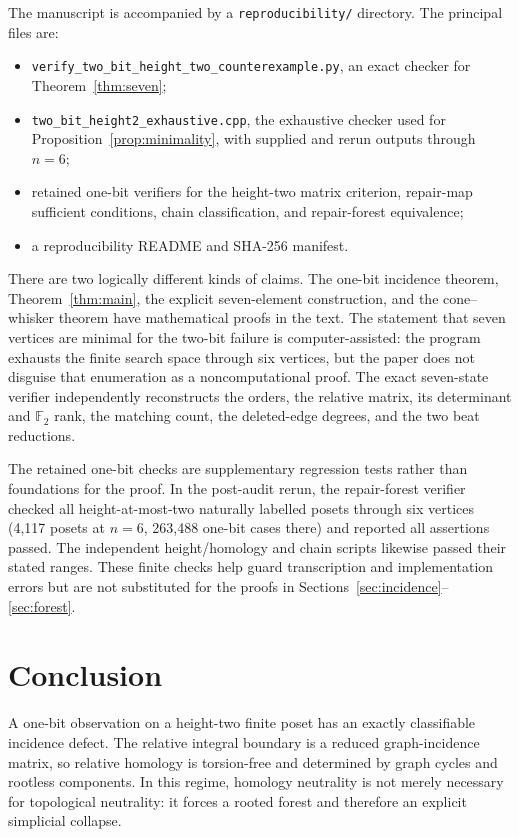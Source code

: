 \documentclass[11pt]{article}
\theoremstyle{definition}
\theoremstyle{remark}
\newcommand{\Ftwo}{\mathbb F_2}
\begin{document}
The manuscript is accompanied by a \texttt{reproducibility/} directory.  The principal
files are:
\begin{itemize}
\item \texttt{verify\_two\_bit\_height\_two\_counterexample.py}, an exact checker for
Theorem~\ref{thm:seven};
\item \texttt{two\_bit\_height2\_exhaustive.cpp}, the exhaustive checker used for
Proposition~\ref{prop:minimality}, with supplied and rerun outputs through $n=6$;
\item retained one-bit verifiers for the height-two matrix criterion, repair-map
sufficient conditions, chain classification, and repair-forest equivalence;
\item a reproducibility README and SHA-256 manifest.
\end{itemize}

There are two logically different kinds of claims.  The one-bit incidence theorem,
Theorem~\ref{thm:main}, the explicit seven-element construction, and the cone--whisker
theorem have mathematical proofs in the text.  The statement that seven vertices are
minimal for the two-bit failure is computer-assisted: the program exhausts the finite
search space through six vertices, but the paper does not disguise that enumeration as
a noncomputational proof.  The exact seven-state verifier independently reconstructs
the orders, the relative matrix, its determinant and $\Ftwo$ rank, the matching count,
the deleted-edge degrees, and the two beat reductions.

The retained one-bit checks are supplementary regression tests rather than foundations
for the proof.  In the post-audit rerun, the repair-forest verifier checked all
height-at-most-two naturally labelled posets through six vertices (4,117 posets at
$n=6$, 263,488 one-bit cases there) and reported all assertions passed.  The independent
height/homology and chain scripts likewise passed their stated ranges.  These finite
checks help guard transcription and implementation errors but are not substituted for
the proofs in Sections~\ref{sec:incidence}--\ref{sec:forest}.

\section{Conclusion}\label{sec:conclusion}

A one-bit observation on a height-two finite poset has an exactly classifiable
incidence defect.  The relative integral boundary is a reduced graph-incidence matrix,
so relative homology is torsion-free and determined by graph cycles and rootless
components.  In this regime, homology neutrality is not merely necessary for topological
neutrality: it forces a rooted forest and therefore an explicit simplicial collapse.
\end{document}

